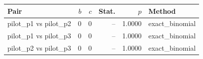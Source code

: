 \begin{tabular}{lrrrrl}
\toprule
Pair & $b$ & $c$ & Stat. & $p$ & Method \\
\midrule
pilot_p1 vs pilot_p2 & 0 & 0 & -- & 1.0000 & exact\_binomial \\
pilot_p1 vs pilot_p3 & 0 & 0 & -- & 1.0000 & exact\_binomial \\
pilot_p2 vs pilot_p3 & 0 & 0 & -- & 1.0000 & exact\_binomial \\
\bottomrule
\end{tabular}
